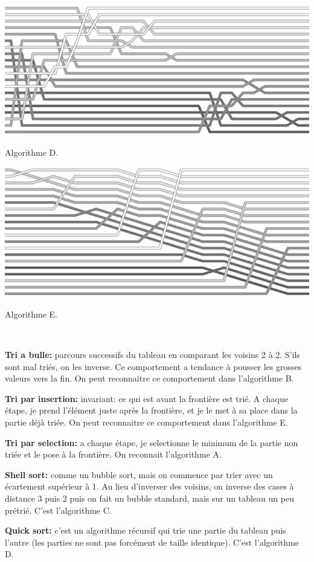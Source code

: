 \documentclass[10pt]{article}\usepackage[nu]{esial}
\begin{document}
\noindent\hfill\begin{minipage}{.35\linewidth}
  \includegraphics[width=\linewidth]{quick.png}

  \centerline{Algorithme D.}
\end{minipage}\hfill\begin{minipage}{.35\linewidth}
  \includegraphics[width=\linewidth]{insertion.png}

  \centerline{Algorithme E.}
\end{minipage}\hfill~

\begin{Reponse}
  \textbf{Tri a bulle:} parcours successifs du tableau en comparant les voisins
  2 à 2. S'ils sont mal triés, on les inverse. Ce comportement a tendance à
  pousser les grosses valeurs vers la fin. On peut reconnaitre ce comportement
  dans l'algorithme B.

  \textbf{Tri par insertion:} invariant: ce qui est avant la frontière est
  trié. A chaque étape, je prend l'élément juste après la frontière, et je le
  met à sa place dans la partie déjà triée. On peut reconnaitre ce comportement
  dans l'algorithme E.

  \textbf{Tri par selection:} a chaque étape, je selectionne le minimum de la
  partie non triée et le pose à la frontière. On reconnait l'algorithme A.

  \textbf{Shell sort:} comme un bubble sort, mais on commence par trier avec un
  écartement supérieur à 1. Au lieu d'inverser des voisins, on inverse des
  cases à distance 3 puis 2 puis on fait un bubble standard, mais sur un
  tableau un peu prétrié. C'est l'algorithme C.

  \textbf{Quick sort:} c'est un algorithme récursif qui trie une partie du
  tableau puis l'autre (les parties ne sont pas forcément de taille
  identique). C'est l'algorithme D.
\end{Reponse}
\end{document}
